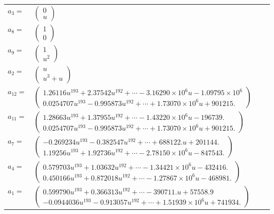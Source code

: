 \documentclass[1p]{elsarticle_modified}
\theoremstyle{definition}
\begin{document}
\begin{tabular}{m{7pt} m{180pt} m{7pt} m{180pt} }
\flushright $a_{3}=$&$\begin{pmatrix}0\\u\end{pmatrix}$ \\
\flushright $a_{8}=$&$\begin{pmatrix}1\\0\end{pmatrix}$ \\
\flushright $a_{9}=$&$\begin{pmatrix}1\\u^2\end{pmatrix}$ \\
\flushright $a_{2}=$&$\begin{pmatrix}u\\u^3+u\end{pmatrix}$ \\
\flushright $a_{12}=$&$\begin{pmatrix}1.26116 u^{193}+2.37542 u^{192}+\cdots-3.16290\times10^{6} u-1.09795\times10^{6}\\0.0254707 u^{193}-0.995873 u^{192}+\cdots+1.73070\times10^{6} u+901215.\end{pmatrix}$ \\
\flushright $a_{11}=$&$\begin{pmatrix}1.28663 u^{193}+1.37955 u^{192}+\cdots-1.43220\times10^{6} u-196739.\\0.0254707 u^{193}-0.995873 u^{192}+\cdots+1.73070\times10^{6} u+901215.\end{pmatrix}$ \\
\flushright $a_{7}=$&$\begin{pmatrix}-0.269234 u^{193}-0.382547 u^{192}+\cdots+688122. u+201144.\\1.19256 u^{193}+1.92736 u^{192}+\cdots-2.78150\times10^{6} u-847543.\end{pmatrix}$ \\
\flushright $a_{4}=$&$\begin{pmatrix}0.579703 u^{193}+1.03632 u^{192}+\cdots-1.34421\times10^{6} u-432416.\\0.450166 u^{193}+0.872018 u^{192}+\cdots-1.27867\times10^{6} u-468981.\end{pmatrix}$ \\
\flushright $a_{1}=$&$\begin{pmatrix}0.599790 u^{193}+0.366313 u^{192}+\cdots-390711. u+57558.9\\-0.0944036 u^{193}-0.913057 u^{192}+\cdots+1.51939\times10^{6} u+741934.\end{pmatrix}$ \\

\end{tabular}
\end{document}
